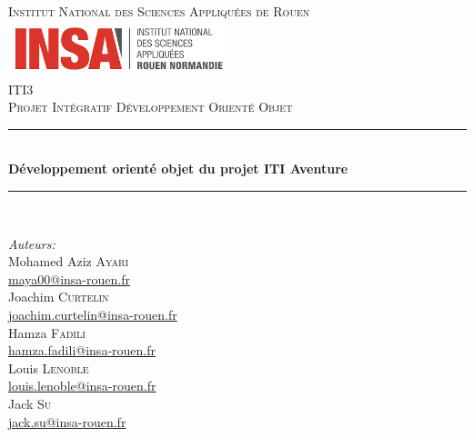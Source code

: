 \documentclass[a4paper, 12pt]{report}
\newcommand{\HRule}{\rule{\linewidth}{0.5mm}}
\begin{document}

\begin{titlepage}
	\begin{center}
		\textsc{\LARGE Institut National des Sciences Appliquées de Rouen}
		\vspace{5mm}
		\bigbreak
		\includegraphics[width=0.48\textwidth]{logo.png}\\[1.0 cm]
		\textsc{\Large ITI3}\\[0.5cm]
		\textsc{\Large Projet Intégratif Développement Orienté Objet}\\
		\vspace{0.2cm}
		\hspace{1pt}
		\HRule \\[1pt]
		{\huge \bfseries Développement orienté objet
		du projet ITI Aventure}\\[0.4cm]
		\HRule \\[0.5cm]
		\singlespacing    
		\begin{minipage}{0.4\textwidth}
			\begin{flushleft} \large
				\emph{Auteurs:}\\
				Mohamed Aziz \textsc{Ayari} \\
				{\small\href{mailto:maya00@insa-rouen.fr}{maya00@insa-rouen.fr}}\\
				Joachim \textsc{Curtelin}\\
				{\small\href{mailto:joachim.curtelin@insa-rouen.fr}{joachim.curtelin@insa-rouen.fr}}
				\\
				Hamza \textsc{Fadili} \\
				{\small\href{mailto:hamza.fadili@insa-rouen.fr}{hamza.fadili@insa-rouen.fr}}
				\\
				Louis \textsc{Lenoble} \\
				{\small\href{mailto:louis.lenoble@insa-rouen.fr}{louis.lenoble@insa-rouen.fr}}
				\\
				Jack \textsc{Su} \\
				{\small\href{mailto:jack.su@insa-rouen.fr}{jack.su@insa-rouen.fr}}
				\\
			\end{flushleft}
		\end{minipage}
		\begin{minipage}{0.4\textwidth}

\end{minipage}
\end{center}
\end{titlepage}
\end{document}
